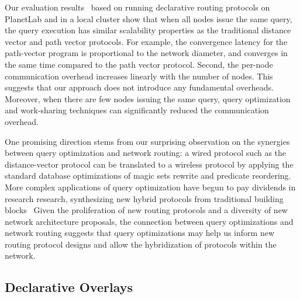 Our evaluation results~\cite{declareRoute} based on running
declarative routing protocols on PlanetLab and in a local cluster show
that when all nodes issue the same query, the query execution has
similar scalability properties as the traditional distance vector and
path vector protocols. For example, the convergence latency for the
path-vector program is proportional to the network diameter, and
converges in the same time compared to the path vector
protocol. Second, the per-node communication overhead increases
linearly with the number of nodes. This suggests that our approach
does not introduce any fundamental overheads. Moreover, when there are
few nodes issuing the same query, query optimization and work-sharing
techniques can significantly reduced the communication overhead.

One promising direction stems from our surprising observation on the
synergies between query optimization and network routing: a wired
protocol such as the distance-vector protocol can be translated to a
wireless protocol by applying the standard database optimizations of
magic sets rewrite and predicate reordering.  More complex applications of 
query optimization have begun to pay dividends in research research, synthesizing new hybrid protocols from traditional building blocks~\cite{chu09,chuthesis}
Given the proliferation
of new routing protocols and a diversity of new network architecture
proposals, the connection between query optimizations and network
routing suggests that query optimizations may help us inform new
routing protocol designs and allow the hybridization of protocols
within the network.













\subsection{Declarative Overlays}

